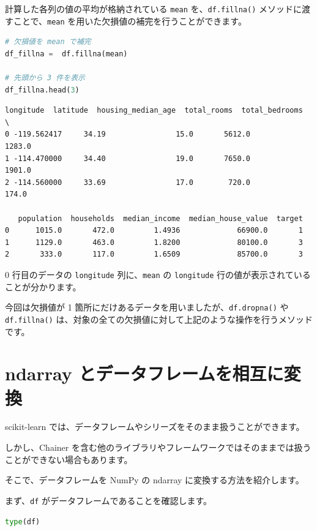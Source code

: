 計算した各列の値の平均が格納されている \texttt{mean} を、\texttt{df.fillna()} メソッドに渡すことで、\texttt{mean} を用いた欠損値の補完を行うことができます。


\begin{lstlisting}[style=codecell,language=Python]
# 欠損値を mean で補完
df_fillna =  df.fillna(mean)

# 先頭から 3 件を表示
df_fillna.head(3)
\end{lstlisting}

\begin{lstlisting}[style=outputcell]
    longitude  latitude  housing_median_age  total_rooms  total_bedrooms  \
0 -119.562417     34.19                15.0       5612.0          1283.0   
1 -114.470000     34.40                19.0       7650.0          1901.0   
2 -114.560000     33.69                17.0        720.0           174.0   

   population  households  median_income  median_house_value  target  
0      1015.0       472.0         1.4936             66900.0       1  
1      1129.0       463.0         1.8200             80100.0       3  
2       333.0       117.0         1.6509             85700.0       3  
\end{lstlisting}

0 行目のデータの \texttt{longitude} 列に、\texttt{mean} の \texttt{longitude} 行の値が表示されていることが分かります。


今回は欠損値が 1 箇所にだけあるデータを用いましたが、\texttt{df.dropna()} や \texttt{df.fillna()} は、対象の全ての欠損値に対して上記のような操作を行うメソッドです。


\section{ndarray とデータフレームを相互に変換}


scikit-learn では、データフレームやシリーズをそのまま扱うことができます。

しかし、Chainer を含む他のライブラリやフレームワークではそのままでは扱うことができない場合もあります。

そこで、データフレームを NumPy の ndarray に変換する方法を紹介します。


まず、\texttt{df} がデータフレームであることを確認します。


\begin{lstlisting}[style=codecell,language=Python]
type(df)
\end{lstlisting}

